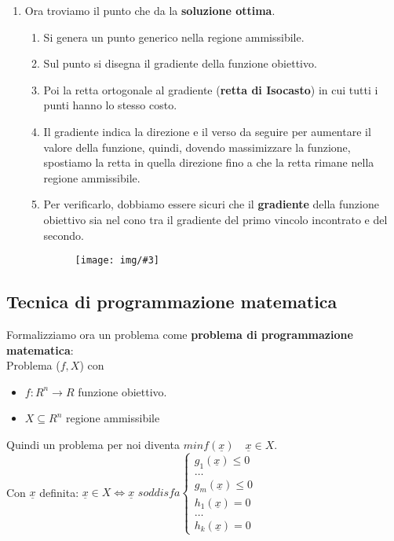 \documentclass[12pt, twoside, letterpaper]{article}
\newcommand{\vx}[0]{
	\underline{x}
}
\newcommand{\img}[3] {
	\begin{figure}[h]
		\caption*{#1}
		\centering
		\texttt{[image: img/\#3]}\\
	\end{figure}
}
\begin{document}
\begin{enumerate}
				\item Ora troviamo il punto che da la \textbf{soluzione ottima}.
				\begin{enumerate}
					\item Si genera un punto generico nella regione ammissibile.
					\item Sul punto si disegna il gradiente della funzione obiettivo.
					\item Poi la retta ortogonale al gradiente (\textbf{retta di Isocasto}) in cui tutti i punti hanno lo stesso costo.
					\item Il gradiente indica la direzione e il verso da seguire per aumentare il valore della funzione, quindi, dovendo massimizzare la funzione, spostiamo la retta in quella direzione fino a che la retta rimane nella regione ammissibile.
					\item Per verificarlo, dobbiamo essere sicuri che il \textbf{gradiente} della funzione obiettivo sia nel cono tra il gradiente del primo vincolo incontrato e del secondo.
					\img{}{0.25}{img3.jpg}
				\end{enumerate}
			\end{enumerate}
			
		\subsection{Tecnica di programmazione matematica}
			Formalizziamo ora un problema come \textbf{problema di programmazione matematica}:\\
			Problema ($f, X$) con 
			\begin{itemize}
				\item $f: R^n \rightarrow R$ funzione obiettivo.
				\item $X \subseteq R^n$ regione ammissibile
			\end{itemize}
			Quindi un problema per noi diventa $min f(\underline{x}) \quad \underline{x} \in X$.\\
			Con $\underline{x}$ definita: $\underline{x} \in X \iff \vx$ $soddisfa
			\begin{cases} 
				g_1(\underline{x}) \leq 0\\
				\dots \\
				g_m(\underline{x}) \leq 0 \\
				h_1(\underline{x}) = 0 \\
				\dots \\
				h_k(\underline{x}) = 0
			\end{cases}$
			
\end{document}
